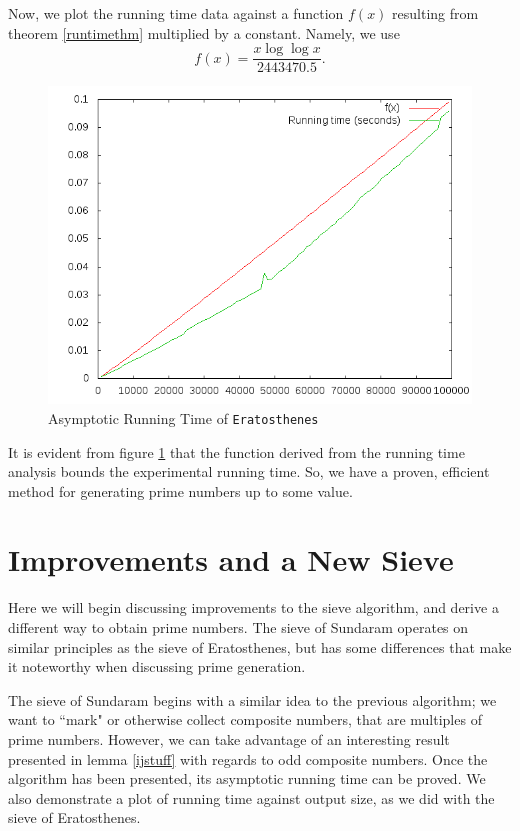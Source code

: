 \documentclass{amsart}
\theoremstyle{definition}
\theoremstyle{case}
\begin{document}
	Now, we plot the running time data against a function $f(x)$ resulting from theorem \ref{runtimethm} multiplied by a constant. Namely, we use
	$$ f(x) = \frac{x \log \log x}{2443470.5} . $$
	
	\begin{figure}\caption{Asymptotic Running Time of \texttt{Eratosthenes}}
		\label{runtime1}
		\includegraphics[scale=0.5]{erat3.png}
	\end{figure}
	
	It is evident from figure \ref{runtime1} that the function derived from the running time analysis bounds the experimental running time. So, we have a proven, efficient method for generating prime numbers up to some value.
	
	\section{Improvements and a New Sieve}
	
	Here we will begin discussing improvements to the sieve algorithm, and derive a different way to obtain prime numbers. The sieve of Sundaram operates on similar principles as the sieve of Eratosthenes, but has some differences that make it noteworthy when discussing prime generation.
	
	The sieve of Sundaram begins with a similar idea to the previous algorithm; we want to ``mark" or otherwise collect composite numbers, that are multiples of prime numbers. However, we can take advantage of an interesting result presented in lemma \ref{ijstuff} with regards to odd composite numbers.
	Once the algorithm has been presented, its asymptotic running time can be proved. We also demonstrate a plot of running time against output size, as we did with the sieve of Eratosthenes.
	
\end{document}
